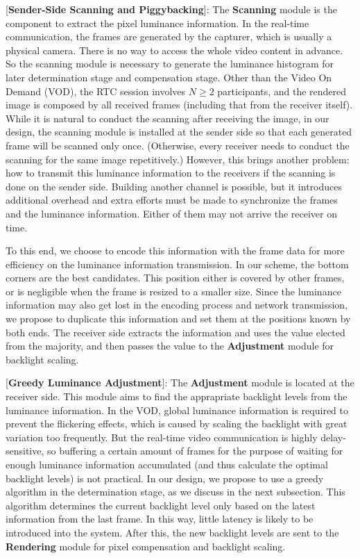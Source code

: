 [{\bf Sender-Side Scanning and Piggybacking}]:
The {\bf Scanning} module is the component to extract the pixel
luminance information. In the real-time communication, the frames are
generated by the capturer, which is usually a physical camera. There
is no way to access the whole video content in advance. So the
scanning module is necessary to generate the luminance histogram for
later determination stage and compensation stage. Other than the Video
On Demand (VOD), the RTC session involves $N \ge 2$ participants, and
the rendered image is composed by all received frames (including that
from the receiver itself). While it is natural to conduct the scanning
after receiving the image, in our design,  the scanning module is
installed at the sender side so that each generated frame will be
scanned only once. (Otherwise, every receiver needs to conduct the
scanning for the same image repetitively.)  However, this brings
another problem: how to transmit this luminance information to the
receivers if the scanning is done on the sender side. Building another
channel is possible, but it introduces additional overhead and extra
efforts must be made to synchronize the frames and the luminance
information. Either of them may not arrive the receiver on time.

To this end, we choose to encode this information with the frame data
for more efficiency on the luminance information transmission.  In our
scheme, the bottom corners are the best candidates. This position
either is covered by other frames, or is negligible when the frame is
resized to a smaller size.  Since the luminance information may also get
lost in the encoding process and network transmission, we propose to
duplicate this information and set them at the positions known by both
ends. The receiver side extracts the information and uses the value
elected from the majority, and then passes the value to the {\bf
  Adjustment} module for backlight scaling.

[{\bf Greedy Luminance Adjustment}]: The {\bf Adjustment} module is located at the receiver side. This
module aims to find the apprapriate backlight levels from the
luminance information. In the VOD, global luminance information is
required to prevent the flickering effects, which is caused by scaling
the backlight with great variation too frequently. But 
 the real-time video communication is highly delay-sensitive, so buffering a certain
amount of frames for the purpose of waiting for enough luminance
information accumulated (and thus calculate the optimal backlight levels) is not
practical. In our design, we propose to use a greedy algorithm in the
determination stage, as we discuss in the next subsection. This
algorithm determines the current backlight level
only based on the latest information from the last frame. In this way,
little latency is likely to be introduced into the system. After this,
the new backlight levels are sent to the {\bf Rendering} module for
pixel compensation and backlight scaling.

